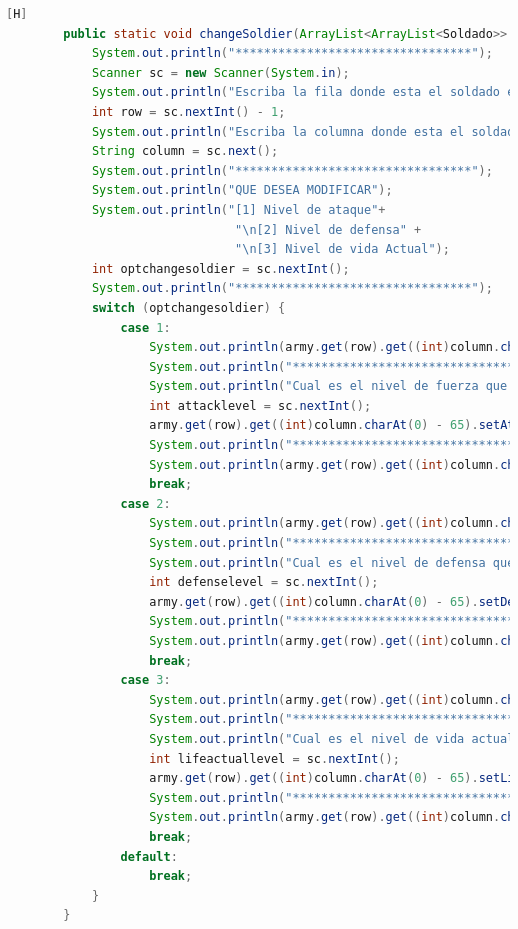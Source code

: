 \documentclass{article}
\begin{document}
	\begin{lstlisting}[language=java,caption={Las lineas de codigos del metodo creado:}][H]
		public static void changeSoldier(ArrayList<ArrayList<Soldado>> army){
			System.out.println("*********************************");
			Scanner sc = new Scanner(System.in);
			System.out.println("Escriba la fila donde esta el soldado el cual modificara:");
			int row = sc.nextInt() - 1;
			System.out.println("Escriba la columna donde esta el soldado el cual modificara:");
			String column = sc.next();
			System.out.println("*********************************");
			System.out.println("QUE DESEA MODIFICAR");
			System.out.println("[1] Nivel de ataque"+
								"\n[2] Nivel de defensa" + 
								"\n[3] Nivel de vida Actual");
			int optchangesoldier = sc.nextInt();
			System.out.println("*********************************");
			switch (optchangesoldier) {
				case 1:
					System.out.println(army.get(row).get((int)column.charAt(0) - 65).toString());
					System.out.println("*********************************");
					System.out.println("Cual es el nivel de fuerza que le pondra del 1 al 5 ");
					int attacklevel = sc.nextInt();
					army.get(row).get((int)column.charAt(0) - 65).setAttackLevel(attacklevel);
					System.out.println("*********************************");
					System.out.println(army.get(row).get((int)column.charAt(0) - 65).toString());
					break;
				case 2:
					System.out.println(army.get(row).get((int)column.charAt(0) - 65).toString());
					System.out.println("*********************************");
					System.out.println("Cual es el nivel de defensa que le pondra del 1 al 5 ");
					int defenselevel = sc.nextInt();
					army.get(row).get((int)column.charAt(0) - 65).setDefenseLevel(defenselevel);
					System.out.println("*********************************");
					System.out.println(army.get(row).get((int)column.charAt(0) - 65).toString());
					break;
				case 3:
					System.out.println(army.get(row).get((int)column.charAt(0) - 65).toString());
					System.out.println("*********************************");
					System.out.println("Cual es el nivel de vida actual que le pondra del 1 al 5 ");
					int lifeactuallevel = sc.nextInt();
					army.get(row).get((int)column.charAt(0) - 65).setLifeActual(lifeactuallevel);
					System.out.println("*********************************");
					System.out.println(army.get(row).get((int)column.charAt(0) - 65).toString());
					break;
				default:
					break;
			}
		}
	\end{lstlisting}
\end{document}
